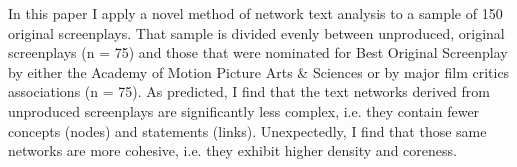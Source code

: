 In this paper I apply a novel method of network text analysis to a sample of 150 original screenplays. That sample is divided evenly between unproduced, original screenplays (n = 75) and those that were nominated for Best Original Screenplay by either the Academy of Motion Picture Arts \& Sciences or by major film critics associations (n = 75). As predicted, I find that the text networks derived from unproduced screenplays are significantly less complex, i.e. they contain fewer concepts (nodes) and statements (links). Unexpectedly, I find that those same networks are more cohesive, i.e. they  exhibit higher density and coreness.
